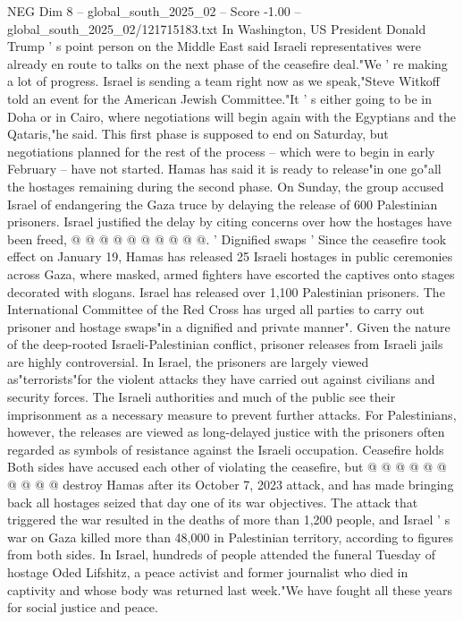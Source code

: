 \begin{textsample}{NEG Dim 8 – global\_south\_2025\_02 – Score -1.00 – global\_south\_2025\_02/121715183.txt}  \label{ex:f8_neg_371}
In Washington, US President Donald Trump ' s point person on the Middle East said Israeli representatives were already en route to talks on the next phase of the ceasefire deal."We ' re making a lot of progress.
Israel is sending a team right now as we speak,"Steve Witkoff told an event for the American Jewish Committee."It ' s either going to be in Doha or in Cairo, where negotiations will begin again with the Egyptians and the Qataris,"he said.
This first phase is supposed to end on Saturday, but negotiations planned for the rest of the process -- which were to begin in early February -- have not started.
Hamas has said it is ready to release"in one go"all the hostages remaining during the second phase.
On Sunday, the group accused Israel of endangering the Gaza truce by delaying the release of 600 Palestinian prisoners.
Israel justified the delay by citing concerns over how the hostages have been freed, @ @ @ @ @ @ @ @ @ @. ' Dignified swaps ' Since the ceasefire took effect on January 19, Hamas has released 25 Israeli hostages in public ceremonies across Gaza, where masked, armed fighters have escorted the captives onto stages decorated with slogans.
Israel has released over 1,100 Palestinian prisoners.
The International Committee of the Red Cross has urged all parties to carry out prisoner and hostage swaps"in a dignified and private manner".
Given the nature of the deep-rooted Israeli-Palestinian conflict, prisoner releases from Israeli jails are highly controversial.
In Israel, the prisoners are largely viewed as"terrorists"for the violent attacks they have carried out against civilians and security forces.
The Israeli authorities and much of the public see their imprisonment as a necessary measure to prevent further attacks.
For Palestinians, however, the releases are viewed as long-delayed justice with the prisoners often regarded as symbols of resistance against the Israeli occupation.
Ceasefire holds Both sides have accused each other of violating the ceasefire, but @ @ @ @ @ @ @ @ @ @ destroy Hamas after its October 7, 2023 attack, and has made bringing back all hostages seized that day one of its war objectives.
The attack that triggered the war resulted in the deaths of more than 1,200 people, and Israel ' s war on Gaza killed more than 48,000 in Palestinian territory, according to figures from both sides.
In Israel, hundreds of people attended the funeral Tuesday of hostage Oded Lifshitz, a peace activist and former journalist who died in captivity and whose body was returned last week."We have fought all these years for social justice and peace.

\end{textsample}
